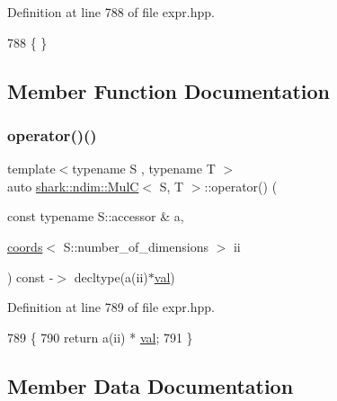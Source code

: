 Definition at line 788 of file expr.\+hpp.


\begin{DoxyCode}
788 \{ \}
\end{DoxyCode}


\subsection{Member Function Documentation}
\hypertarget{classshark_1_1ndim_1_1_mul_c_a81f80d754e0c9852bcf6ce4f58a55c64}{}\label{classshark_1_1ndim_1_1_mul_c_a81f80d754e0c9852bcf6ce4f58a55c64} 
\subsubsection{\texorpdfstring{operator()()}{operator()()}}
{\footnotesize\ttfamily template$<$typename S , typename T $>$ \\
auto \hyperlink{classshark_1_1ndim_1_1_mul_c}{shark\+::ndim\+::\+MulC}$<$ S, T $>$\+::operator() (\begin{DoxyParamCaption}\item[{const typename S\+::accessor \&}]{a,  }\item[{\hyperlink{structshark_1_1ndim_1_1coords}{coords}$<$ S\+::number\+\_\+of\+\_\+dimensions $>$}]{ii }\end{DoxyParamCaption}) const -\/$>$ decltype(a(ii)$\ast$\hyperlink{classshark_1_1ndim_1_1_mul_c_adf2e920c0c3a31d93f551ba6d75170cd}{val}) \hspace{0.3cm}{\ttfamily [inline]}}



Definition at line 789 of file expr.\+hpp.


\begin{DoxyCode}
789                                                                                                            
                   \{
790                 \textcolor{keywordflow}{return} a(ii) * \hyperlink{classshark_1_1ndim_1_1_mul_c_adf2e920c0c3a31d93f551ba6d75170cd}{val};
791             \}
\end{DoxyCode}


\subsection{Member Data Documentation}
\hypertarget{classshark_1_1ndim_1_1_mul_c_adf2e920c0c3a31d93f551ba6d75170cd}{}\label{classshark_1_1ndim_1_1_mul_c_adf2e920c0c3a31d93f551ba6d75170cd} 
